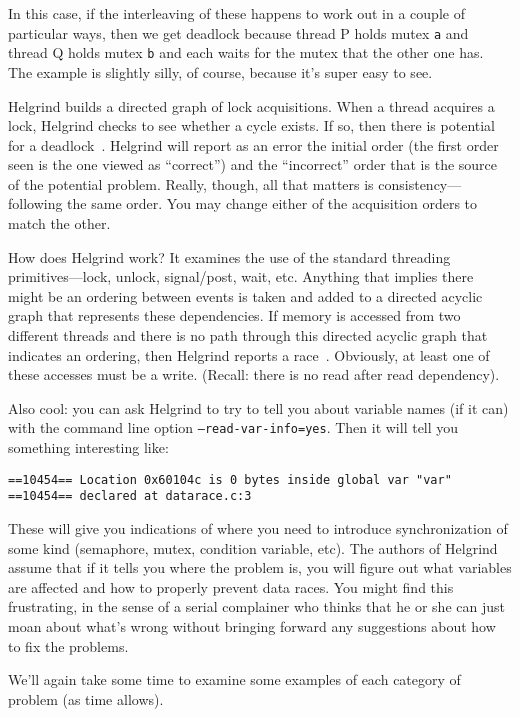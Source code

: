 In this case, if the interleaving of these happens to work out in a couple of particular ways, then we get deadlock because thread P holds mutex \texttt{a} and thread Q holds mutex \texttt{b} and each waits for the mutex that the other one has. The example is slightly silly, of course, because it's super easy to see.

Helgrind builds a directed graph of lock acquisitions. When a thread acquires a lock, Helgrind checks to see whether a cycle exists. If so, then there is potential for a deadlock~\cite{helgrind}. Helgrind will report as an error the initial order (the first order seen is the one viewed as ``correct'') and the ``incorrect'' order that is the source of the potential problem. Really, though, all that matters is consistency---following the same order. You may change either of the acquisition orders to match the other. 

How does Helgrind work? It examines the use of the standard threading primitives---lock, unlock, signal/post, wait, etc. Anything that implies there might be an ordering between events is taken and added to a directed acyclic graph that represents these dependencies. If memory is accessed from two different threads and there is no path through this directed acyclic graph that indicates an ordering, then Helgrind reports a race~\cite{helgrind}. Obviously, at least one of these accesses must be a write. (Recall: there is no read after read dependency).

Also cool: you can ask Helgrind to try to tell you about variable names (if it can) with the command line option \texttt{--read-var-info=yes}. Then it will tell you something interesting like:

\begin{lstlisting}
==10454== Location 0x60104c is 0 bytes inside global var "var"
==10454== declared at datarace.c:3
\end{lstlisting}

These will give you indications of where you need to introduce synchronization of some kind (semaphore, mutex, condition variable, etc). The authors of Helgrind assume that if it tells you where the problem is, you will figure out what variables are affected and how to properly prevent data races. You might find this frustrating, in the sense of a serial complainer who thinks that he or she can just moan about what's wrong without bringing forward any suggestions about how to fix the problems.

We'll again take some time to examine some examples of each category of problem (as time allows). 




